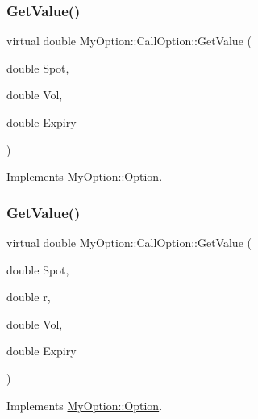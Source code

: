\subsubsection{\texorpdfstring{Get\+Value()}{GetValue()}\hspace{0.1cm}{\footnotesize\ttfamily [2/3]}}
{\footnotesize\ttfamily virtual double My\+Option\+::\+Call\+Option\+::\+Get\+Value (\begin{DoxyParamCaption}\item[{double}]{Spot,  }\item[{double}]{Vol,  }\item[{double}]{Expiry }\end{DoxyParamCaption})\hspace{0.3cm}{\ttfamily [virtual]}}



Implements \hyperlink{classMyOption_1_1Option_a78fa248dcb939e0ebaefbb944d5d9cf8}{My\+Option\+::\+Option}.

\hypertarget{classMyOption_1_1CallOption_a2a3ca51422260a20ac9d151f38980df7}{}\label{classMyOption_1_1CallOption_a2a3ca51422260a20ac9d151f38980df7} 
\subsubsection{\texorpdfstring{Get\+Value()}{GetValue()}\hspace{0.1cm}{\footnotesize\ttfamily [3/3]}}
{\footnotesize\ttfamily virtual double My\+Option\+::\+Call\+Option\+::\+Get\+Value (\begin{DoxyParamCaption}\item[{double}]{Spot,  }\item[{double}]{r,  }\item[{double}]{Vol,  }\item[{double}]{Expiry }\end{DoxyParamCaption})\hspace{0.3cm}{\ttfamily [virtual]}}



Implements \hyperlink{classMyOption_1_1Option_a62422d3dc60eabe65cfa94d2a452f5f8}{My\+Option\+::\+Option}.

\hypertarget{classMyOption_1_1CallOption_a397e70701e8a882e0205193513d27b97}{}\label{classMyOption_1_1CallOption_a397e70701e8a882e0205193513d27b97} 

